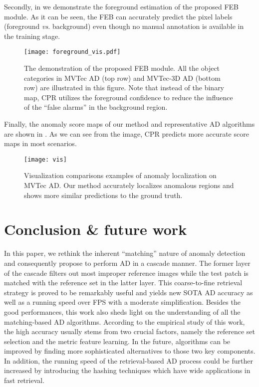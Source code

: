 \documentclass[lettersize,journal]{IEEEtran}
\begin{document}
Secondly, in  we demonstrate the foreground estimation of the proposed FEB module. As it can be seen, the FEB can accurately predict the pixel labels (foreground \emph{vs.} background) even though no manual annotation is available in the training stage.

\begin{figure*}[htbp]
  \centering
  \texttt{[image: foreground\_vis.pdf]}
  \caption{
    The demonstration of the proposed FEB module. All the object categories in MVTec AD (top row) and MVTec-3D AD (bottom row) are illustrated in this figure. Note that instead of the binary map, CPR utilizes the foreground confidence to reduce the influence of the ``false alarms'' in the background region.
  }
  \label{fig:foreground_vis}
\end{figure*}

Finally, the anomaly score maps of our method and  representative AD algorithms are
shown in . As we can see from the image, CPR predicts more accurate
score maps in most scenarios.
\begin{figure*}[htbp]
  \centering
  \texttt{[image: vis]}
  \caption{
    Visualization comparisons examples of anomaly localization on MVTec AD. Our method
    accurately localizes anomalous regions and shows more similar predictions to the ground
    truth.
  }
  \label{fig:vis}
\end{figure*}

\section{Conclusion \& future work}
\label{sec:conclusion}
In this paper, we rethink the inherent ``matching'' nature of anomaly detection and consequently
propose to perform AD in a cascade manner. The former layer of the cascade filters out
most improper reference images while the test patch is matched with the reference set in
the latter layer. This coarse-to-fine retrieval strategy is proved to be remarkably useful
and yields new SOTA AD accuracy as well as a running speed over  FPS with a
moderate simplification. Besides the good performances, this work also sheds light on
the understanding of all the matching-based AD algorithms. According to the empirical
study of this work, the high accuracy usually stems from two crucial factors, namely the
reference set selection and the metric feature learning. In the future, algorithms
can be improved
by finding more sophisticated alternatives to those two key components.
In addition, the running speed of the retrieval-based AD process could be further
increased by introducing the hashing techniques which have wide applications in
fast
retrieval.



\end{document}
